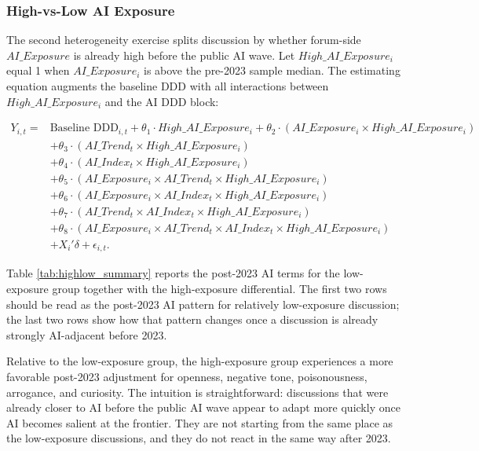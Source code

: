\documentclass[11pt]{article}
\begin{document}
\FloatBarrier

\subsubsection{High-vs-Low AI Exposure}

The second heterogeneity exercise splits discussion by whether forum-side $AI\_Exposure$ is already high before the public AI wave. Let $High\_AI\_Exposure_i$ equal 1 when $AI\_Exposure_i$ is above the pre-2023 sample median. The estimating equation augments the baseline DDD with all interactions between $High\_AI\_Exposure_i$ and the AI DDD block:

\begin{equation}
\begin{aligned}
Y_{i,t} ={}& \text{Baseline DDD}_{i,t}
+ \theta_1 \cdot High\_AI\_Exposure_i
+ \theta_2 \cdot \left(AI\_Exposure_i \times High\_AI\_Exposure_i\right) \\
&+ \theta_3 \cdot \left(AI\_Trend_t \times High\_AI\_Exposure_i\right) \\
&+ \theta_4 \cdot \left(AI\_Index_t \times High\_AI\_Exposure_i\right) \\
&+ \theta_5 \cdot \left(AI\_Exposure_i \times AI\_Trend_t \times High\_AI\_Exposure_i\right) \\
&+ \theta_6 \cdot \left(AI\_Exposure_i \times AI\_Index_t \times High\_AI\_Exposure_i\right) \\
&+ \theta_7 \cdot \left(AI\_Trend_t \times AI\_Index_t \times High\_AI\_Exposure_i\right) \\
&+ \theta_8 \cdot \left(AI\_Exposure_i \times AI\_Trend_t \times AI\_Index_t \times High\_AI\_Exposure_i\right) \\
&+ X_i' \delta + \epsilon_{i,t}.
\end{aligned}
\end{equation}

Table \ref{tab:highlow_summary} reports the post-2023 AI terms for the low-exposure group together with the high-exposure differential. The first two rows should be read as the post-2023 AI pattern for relatively low-exposure discussion; the last two rows show how that pattern changes once a discussion is already strongly AI-adjacent before 2023.

Relative to the low-exposure group, the high-exposure group experiences a more favorable post-2023 adjustment for openness, negative tone, poisonousness, arrogance, and curiosity. The intuition is straightforward: discussions that were already closer to AI before the public AI wave appear to adapt more quickly once AI becomes salient at the frontier. They are not starting from the same place as the low-exposure discussions, and they do not react in the same way after 2023.
\end{document}
